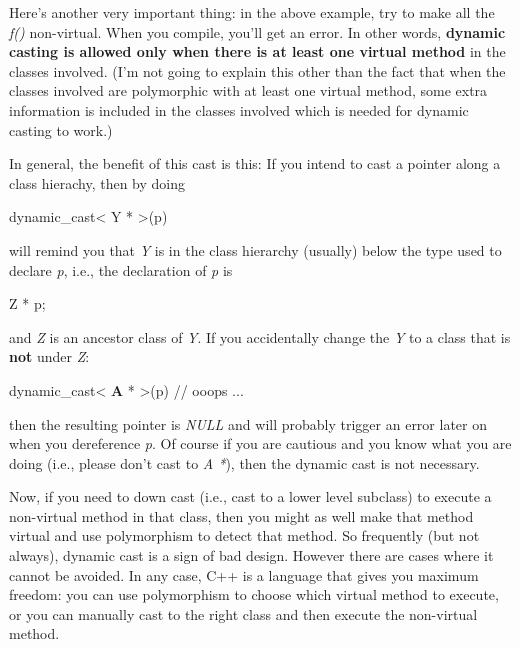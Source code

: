 \documentclass[
]{article}
\begin{document}
Here's another very important thing: in the above example, try to make
all the \emph{f()} non-virtual. When you compile, you'll get an error.
In other words, \textbf{dynamic casting is allowed only when there is at
least one virtual method} in the classes involved. (I'm not going to
explain this other than the fact that when the classes involved are
polymorphic with at least one virtual method, some extra information is
included in the classes involved which is needed for dynamic casting to
work.)

In general, the benefit of this cast is this: If you intend to cast a
pointer along a class hierachy, then by doing

dynamic\_cast\textless{} Y * \textgreater(p)

will remind you that \emph{Y} is in the class hierarchy (usually) below
the type used to declare \emph{p}, i.e., the declaration of \emph{p} is

Z * p;

and \emph{Z} is an ancestor class of \emph{Y}. If you accidentally
change the \emph{Y} to a class that is \textbf{not} under \emph{Z}:

dynamic\_cast\textless{} \textbf{A} * \textgreater(p) // ooops ...

then the resulting pointer is \emph{NULL} and will probably trigger an
error later on when you dereference \emph{p}. Of course if you are
cautious and you know what you are doing (i.e., please don't cast to
\emph{A *}), then the dynamic cast is not necessary.

Now, if you need to down cast (i.e., cast to a lower level subclass) to
execute a non-virtual method in that class, then you might as well make
that method virtual and use polymorphism to detect that method. So
frequently (but not always), dynamic cast is a sign of bad design.
However there are cases where it cannot be avoided. In any case, C++ is
a language that gives you maximum freedom: you can use polymorphism to
choose which virtual method to execute, or you can manually cast to the
right class and then execute the non-virtual method.
\end{document}
